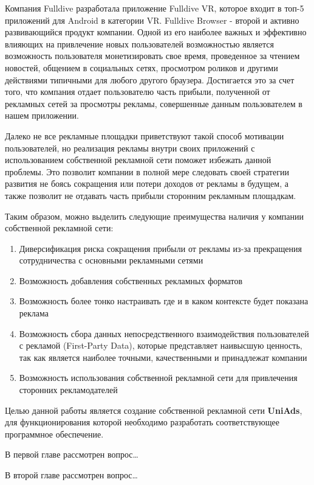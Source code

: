 \documentclass[times]{itmo-student-thesis}
\begin{document}
Компания Fulldive разработала приложение Fulldive VR, которое входит в топ-5 приложений для Android в категории VR. Fulldive Browser - второй и активно развивающийся продукт компании. Одной из его наиболее важных и эффективно влияющих на привлечение новых пользователей возможностью является возможность пользователя монетизировать свое время, проведенное за чтением новостей, общением в социальных сетях, просмотром роликов и другими действиями типичными для любого другого браузера. Достигается это за счет того, что компания отдает пользователю часть прибыли, полученной от рекламных сетей за просмотры рекламы, совершенные данным пользователем в нашем приложении. 

Далеко не все рекламные площадки приветствуют такой способ мотивации пользователей, но реализация рекламы внутри своих приложений с использованием собственной рекламной сети поможет избежать данной проблемы. Это позволит компании в полной мере следовать своей стратегии развития не боясь сокращения или потери доходов от рекламы в будущем, а также позволит не отдавать часть прибыли сторонним рекламным площадкам.

Таким образом, можно выделить следующие преимущества наличия у компании собственной рекламной сети:

\begin{enumerate}
	\item Диверсификация риска сокращения прибыли от рекламы из-за прекращения сотрудничества с основными рекламными сетями
	\item Возможность добавления собственных рекламных форматов
	\item Возможность более тонко настраивать где и в каком контексте будет показана реклама
	\item Возможность сбора данных непосредственного взаимодействия пользователей с рекламой (First-Party Data), которые представляет наивысшую ценность, так как является наиболее точными, качественными и принадлежат компании
	\item Возможность использования собственной рекламной сети для привлечения сторонних рекламодателей
\end{enumerate}

Целью данной работы является создание собственной рекламной сети \textbf{UniAds}, для функционирования которой необходимо разработать соответствующее программное обеспечение.

В первой главе рассмотрен вопрос…

В второй главе рассмотрен вопрос…
\end{document}
